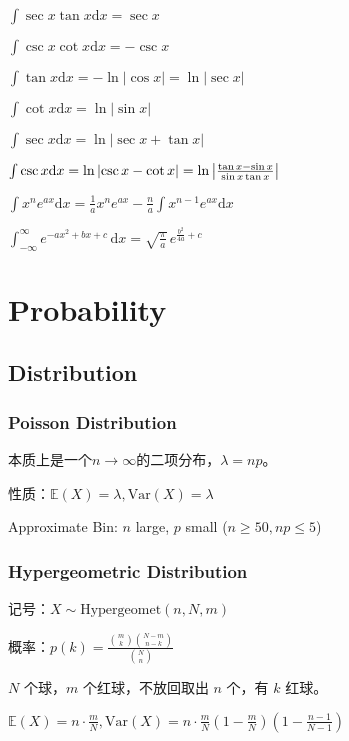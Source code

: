 \documentclass[9pt,landscape]{article}
\begin{document}
\begin{multicols}{3}
$ \int \sec x\tan x{\mbox{d}}x=\sec x $

$ \int \csc x\cot x{\mbox{d}}x=-\csc x $

$ \int \tan x{\mbox{d}}x=-\ln {\left|\cos {x}\right|}=\ln {\left|\sec x\right|} $

$ \int \cot x{\mbox{d}}x=\ln {\left|\sin x\right|} $

$ \int \sec x{\mbox{d}}x=\ln {\left|\sec x+\tan x\right|} $

$ \int \csc x{\mbox{d}}x=\ln {\left|\csc x-\cot x\right|}=\ln {\left|{\tan x-\sin x \over \sin x\tan x}\right|} $

$ \int x^{n}e^{ax}{\mbox{d}}x={\frac {1}{a}}x^{n}e^{ax}-{\frac {n}{a}}\int x^{n-1}e^{ax}{\mbox{d}}x $

$ \int _{-\infty }^{\infty }e^{-ax^{2}+bx+c}\,\mathrm{d}x={\sqrt {\frac {\pi }{a}}}\,e^{{\frac {b^{2}}{4a}}+c} $


\section{Probability}

\subsection{Distribution}

\subsubsection{Poisson Distribution}

本质上是一个$n\to\infty$的二项分布，$\lambda=np$。

性质：$\mathbb{E}(X)=\lambda,\text{Var}(X)=\lambda$

Approximate Bin: $n$ large, $p$ small ($n \ge 50, np \le 5$)

\subsubsection{Hypergeometric Distribution}

记号：$X \sim \text{Hypergeomet}(n, N, m)$

概率：$p(k)=\frac{\binom{m}{k}\binom{N-m}{n-k}}{\binom{N}{n}}$

$N$ 个球，$m$ 个红球，不放回取出 $n$ 个，有 $k$ 红球。

$\mathbb{E}(X)=n\cdot\frac{m}{N}, \mathrm{Var}(X)=n\cdot \frac{m}{N}\left(1-\frac{m}{N}\right)\left(1-\frac{n-1}{N-1}\right)$


\end{multicols}
\end{document}
